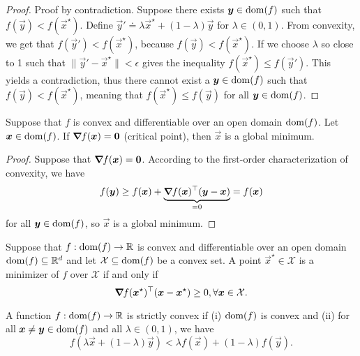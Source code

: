 \begin{proof}
    Proof by contradiction. Suppose there exists $\bm{y}\in\mathrm{dom}(f)$ such that
    $f(\vec{y}) < f(\vec{x}^\star)$. Define $\vec{y}' \doteq \lambda \vec{x}^\star + (1-\lambda) \vec{y}$
    for $\lambda\in(0,1)$. From convexity, we get that $f(\vec{y}') < f(\vec{x}^\star)$, because
    $f(\vec{y}) < f(\vec{x}^\star)$. If we choose $\lambda$ so close to 1 such that
    $\| \vec{y}' - \vec{x}^\star \| < \epsilon$ gives the inequality $f(\vec{x}^\star) \leq f(\vec{y}')$.
    This yields a contradiction, thus there cannot exist a $\bm{y}\in\mathrm{dom}(f)$ such that
    $f(\vec{y}) < f(\vec{x}^\star)$, meaning that $f(\vec{x}^\star) \leq f(\vec{y})$ for all $\bm{y}\in\mathrm{dom}(f)$.
\end{proof}

\begin{lemma}
    Suppose that $f$ is convex and differentiable over an open domain $\mathrm{dom}(f)$. Let $\bm{x}\in\mathrm{dom}(f)$. If $\bm{\nabla}_{\! } f(\bm{x}) = \bm{0}$ (critical point), then $\vec{x}$ is a global minimum.
\end{lemma}

\begin{proof}
    Suppose that $\bm{\nabla}_{\! } f(\bm{x}) = \bm{0}$. According to the first-order characterization of convexity, we have \[
        f(\bm{y}) \geq f(\bm{x}) + \underbrace{\bm{\nabla}_{\! } f(\bm{x})^\top (\bm{y}-\bm{x})}_{=0} = f(\bm{x})
    \]
    for all $\bm{y} \in \mathrm{dom}(f)$, so $\vec{x}$ is a global minimum.
\end{proof}

\begin{lemma}
    \label{lem:optim}

    Suppose that $f: \mathrm{dom}(f) \to \mathbb{R}$ is convex and differentiable over an open domain $\mathrm{dom}(f) \subseteq \mathbb{R}^d$ and let $\mathcal{X} \subseteq \mathrm{dom}(f)$ be a convex set. A point $\vec{x}^\star \in \mathcal{X}$ is a minimizer of $f$ over $\mathcal{X}$ if and only if \[
        \bm{\nabla}_{\! } f(\bm{x}^\star)^\top(\bm{x} - \bm{x}^\star) \geq 0, \forall \bm{x} \in \mathcal{X}.
    \]
\end{lemma}

\begin{definition}
    A function $f: \mathrm{dom}(f)\to \mathbb{R}$ is strictly convex if (i) $\mathrm{dom}(f)$ is convex and (ii) for all $\bm{x} \neq \bm{y}\in \mathrm{dom}(f)$ and all $\lambda\in(0,1)$, we have \[
        f(\lambda \vec{x} + (1-\lambda) \vec{y}) < \lambda f(\vec{x}) + (1-\lambda) f(\vec{y}).
    \]
\end{definition}

